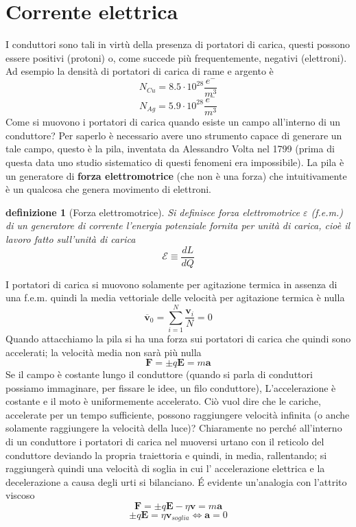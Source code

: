 \documentclass[10pt,a4paper]{article}
\newtheorem{definizione}{definizione}
\begin{document}
\section{Corrente elettrica}
I conduttori sono tali in virtù della presenza di portatori di carica, questi possono essere positivi (protoni) o, come succede più frequentemente, negativi (elettroni). Ad esempio la densità di portatori di carica di rame e argento è
\[N_{Cu} = 8.5 \cdot 10^{28}\frac{e^-}{m^3}\]
\[N_{Ag} = 5.9\cdot 10^{28}\frac{e^-}{m^3}\]
Come si muovono i portatori di carica quando esiste un campo all'interno di un conduttore? Per saperlo è necessario avere uno strumento capace di generare un tale campo, questo è la pila, inventata da Alessandro Volta nel 1799 (prima di questa data uno studio sistematico di questi fenomeni era impossibile). La pila è un generatore di \textbf{forza elettromotrice} (che non è una forza) che intuitivamente è un qualcosa che genera movimento di elettroni.
\begin{definizione}[Forza elettromotrice]
	Si definisce forza elettromotrice \(\varepsilon\) (f.e.m.) di un generatore di corrente l'energia potenziale fornita per unità di carica, cioè il lavoro fatto sull'unità di carica
	\[\mathcal{E} \equiv \frac{dL}{dQ}\]
\end{definizione}
I portatori di carica si muovono solamente per agitazione termica in assenza di una f.e.m. quindi la media vettoriale delle velocità per agitazione termica è nulla
\[\mathbf{\overline{v}}_0= \sum_{i = 1}^{N}\frac{\mathbf{v}_i}{N}=0\]
Quando attacchiamo la pila si ha una forza sui portatori di carica che quindi sono accelerati; la velocità media non sarà più nulla
\[\mathbf{F}= \pm q\mathbf{E}= m \mathbf{a}\]
Se il campo è costante lungo il conduttore (quando si parla di conduttori possiamo immaginare, per fissare le idee, un filo conduttore), L'accelerazione è costante e il moto è uniformemente accelerato. Ciò vuol dire che le cariche, accelerate per un tempo sufficiente, possono raggiungere velocità infinita (o anche solamente raggiungere la velocità della luce)? Chiaramente no perché all'interno di un conduttore i portatori di carica nel muoversi urtano con il reticolo del conduttore deviando la propria traiettoria e quindi, in media, rallentando; si raggiungerà quindi una velocità di soglia in cui l' accelerazione elettrica e la decelerazione a causa degli urti si bilanciano. \'E evidente un'analogia con l'attrito viscoso
\[\mathbf{F} = \pm q\mathbf{E}-\eta\mathbf{v}=m\mathbf{a}\]
\[\pm q\mathbf{E}=\eta\mathbf{v}_{soglia} \Leftrightarrow \mathbf{a}= 0\]
\end{document}
